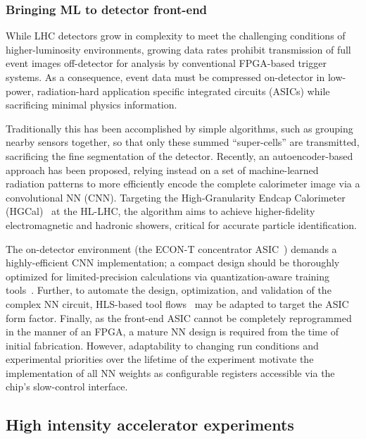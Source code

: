 \subsubsection{Bringing ML to detector front-end}

While LHC detectors grow in complexity to meet the challenging conditions of higher-luminosity environments, growing data rates prohibit transmission of full event images off-detector for analysis by conventional FPGA-based trigger systems.
As a consequence, event data must be compressed on-detector in low-power, radiation-hard application specific integrated circuits (ASICs) while sacrificing minimal physics information.

Traditionally this has been accomplished by simple algorithms, such as grouping nearby sensors together, so that only these summed ``super-cells'' are transmitted, sacrificing the fine segmentation of the detector.
Recently, an autoencoder-based approach has been proposed, relying instead on a set of machine-learned radiation patterns to more efficiently encode the complete calorimeter image via a convolutional NN (CNN).
Targeting the High-Granularity Endcap Calorimeter (HGCal)~\cite{collaboration:2017gbu} at the HL-LHC, the algorithm aims to achieve higher-fidelity electromagnetic and hadronic showers, critical for accurate particle identification.

The on-detector environment (the ECON-T concentrator ASIC~\cite{collaboration:2017gbu}) demands a highly-efficient CNN implementation; a compact design should be thoroughly optimized for limited-precision calculations via quantization-aware training tools~\cite{qkeraspaper}.
Further, to automate the design, optimization, and validation of the complex NN circuit, HLS-based tool flows~\cite{Duarte:2018ite} may be adapted to target the ASIC form factor.
Finally, as the front-end ASIC cannot be completely reprogrammed in the manner of an FPGA, a mature NN design is required from the time of initial fabrication.
However, adaptability to changing run conditions and experimental priorities over the lifetime of the experiment motivate the implementation of all NN weights as configurable registers accessible via the chip's slow-control interface.

\subsection{High intensity accelerator experiments}

